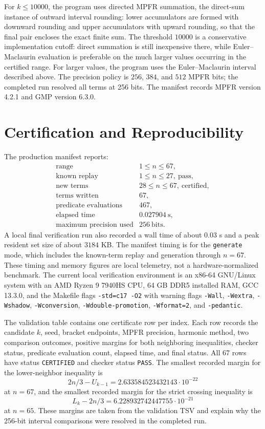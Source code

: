 \documentclass[11pt]{article}
\theoremstyle{definition}
\theoremstyle{remark}
\begin{document}
For \(k\leq 10000\), the program uses directed MPFR summation, the direct-sum
instance of outward interval rounding: lower
accumulators are formed with downward rounding and upper accumulators with
upward rounding, so that the final pair encloses the exact finite sum.  The
threshold \(10000\) is a conservative implementation cutoff: direct summation
is still inexpensive there, while Euler--Maclaurin evaluation is preferable on
the much larger values occurring in the certified range.  For larger values,
the program uses the Euler--Maclaurin interval described above.  The precision
policy is \(256\), \(384\), and \(512\) MPFR bits; the completed run resolved
all terms at 256 bits.  The manifest records MPFR version 4.2.1 and GMP
version 6.3.0.

\section{Certification and Reproducibility}

The production manifest  reports:
\[
\begin{array}{ll}
\text{range} & 1\leq n\leq 67,\\
\text{known replay} & 1\leq n\leq 27,\ \text{pass},\\
\text{new terms} & 28\leq n\leq 67,\ \text{certified},\\
\text{terms written} & 67,\\
\text{predicate evaluations} & 467,\\
\text{elapsed time} & 0.027904\ \text{s},\\
\text{maximum precision used} & 256\ \text{bits}.
\end{array}
\]
A local final verification run also recorded a wall time of about \(0.03\) s and a
peak resident set size of about \(3184\) KB.  The manifest timing is for the
\texttt{generate} mode, which includes the known-term replay and generation
through \(n=67\).  These timing and memory figures are local telemetry, not a
hardware-normalized benchmark.  The current local verification environment is
an x86-64 GNU/Linux system with an AMD Ryzen 9 7940HS CPU, 64 GB DDR5
installed RAM, GCC 13.3.0, and the Makefile flags
\texttt{-std=c17 -O2} with warning flags
\texttt{-Wall}, \texttt{-Wextra}, \texttt{-Wshadow}, \texttt{-Wconversion},
\texttt{-Wdouble-promotion}, \texttt{-Wformat=2}, and \texttt{-pedantic}.

The validation table  contains one
certificate row per index.  Each row records the candidate \(k\), seed,
bracket endpoints, MPFR precision, harmonic method, two comparison outcomes,
positive margins for both neighboring inequalities, checker status, predicate
evaluation count, elapsed time, and final status.  All 67 rows have status
\texttt{CERTIFIED} and checker status \texttt{PASS}.  The smallest recorded
margin for the lower-neighbor inequality is
\[
  2n/3-U_{k-1}=2.633584523432143\cdot 10^{-22}
\]
at \(n=67\), and the smallest recorded margin for the strict crossing
inequality is
\[
  L_k-2n/3=6.228932742447755\cdot 10^{-21}
\]
at \(n=65\).  These margins are taken from the validation TSV and explain why
the 256-bit interval comparisons were resolved in the completed run.
\end{document}
